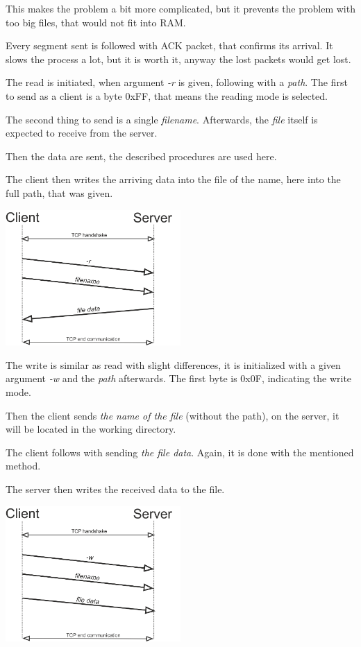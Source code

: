 \documentclass[10pt,a4paper,titlepage]{article}
\begin{document}
This makes the problem a bit more complicated, but it prevents the problem
with too big files, that would not fit into RAM.

Every segment sent is followed with ACK packet, that confirms its arrival.
It slows the process a lot, but it is worth it, anyway the lost packets would
get lost.

\begin{multicols}{2}
The read is initiated, when argument {\it -r} is given, following with a
{\it path}. The first to send as a client is a byte 0xFF, that means the reading
mode is selected.

The second thing to send is a single {\it filename}. Afterwards, the {\it file}
itself is expected to receive from the server.

Then the data are sent, the described procedures are used here.

The client then writes the arriving data into the file of the name, here into
the full path, that was given.

\includegraphics[width=0.5\textwidth]{read.png}
\end{multicols}


\begin{multicols}{2}

The write is similar as read with slight differences, it is initialized
with a given argument {\it -w} and the {\it path} afterwards. The first byte
is 0x0F, indicating the write mode.

Then the client sends {\it the name of the file} (without the path), on the
server, it will be located in the working directory.

The client follows with sending {\it the file data}. Again, it is done
with the mentioned method.

The server then writes the received data to the file.

\includegraphics[width=0.5\textwidth]{write.png}
\end{multicols}
\end{document}
